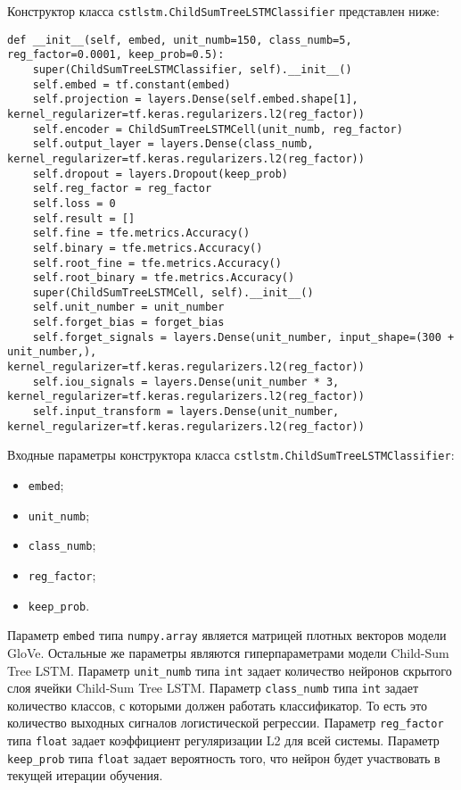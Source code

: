 Конструктор класса \texttt{cstlstm.ChildSumTreeLSTMClassifier} представлен ниже:
\medskip
\begin{lstlisting}[style=Python]
  def __init__(self, embed, unit_numb=150, class_numb=5, reg_factor=0.0001, keep_prob=0.5):
    super(ChildSumTreeLSTMClassifier, self).__init__()
    self.embed = tf.constant(embed)
    self.projection = layers.Dense(self.embed.shape[1], kernel_regularizer=tf.keras.regularizers.l2(reg_factor))
    self.encoder = ChildSumTreeLSTMCell(unit_numb, reg_factor)
    self.output_layer = layers.Dense(class_numb, kernel_regularizer=tf.keras.regularizers.l2(reg_factor))
    self.dropout = layers.Dropout(keep_prob)
    self.reg_factor = reg_factor
    self.loss = 0
    self.result = []
    self.fine = tfe.metrics.Accuracy()
    self.binary = tfe.metrics.Accuracy()
    self.root_fine = tfe.metrics.Accuracy()
    self.root_binary = tfe.metrics.Accuracy()
    super(ChildSumTreeLSTMCell, self).__init__()
    self.unit_number = unit_number
    self.forget_bias = forget_bias
    self.forget_signals = layers.Dense(unit_number, input_shape=(300 + unit_number,), kernel_regularizer=tf.keras.regularizers.l2(reg_factor))
    self.iou_signals = layers.Dense(unit_number * 3, kernel_regularizer=tf.keras.regularizers.l2(reg_factor))
    self.input_transform = layers.Dense(unit_number, kernel_regularizer=tf.keras.regularizers.l2(reg_factor))
\end{lstlisting}
\medskip

Входные параметры конструктора класса \texttt{cstlstm.ChildSumTreeLSTM\-Classifier}:
\begin{itemize}
\item \texttt{embed};
\item \texttt{unit\_numb};
\item \texttt{class\_numb};
\item \texttt{reg\_factor};
\item \texttt{keep\_prob}.
\end{itemize}

Параметр \texttt{embed} типа \texttt{numpy.array} является матрицей плотных векторов модели GloVe. Остальные же параметры являются гиперпараметрами модели Child-Sum Tree LSTM\@. Параметр \texttt{unit\_numb} типа \texttt{int} задает количество нейронов скрытого слоя ячейки Child-Sum Tree LSTM\@. Параметр \texttt{class\_numb} типа \texttt{int} задает количество классов, с которыми должен работать классификатор. То есть это количество выходных сигналов логистической регрессии. Параметр \texttt{reg\_factor} типа \texttt{float} задает коэффициент регуляризации L2 для всей системы. Параметр \texttt{keep\_prob} типа \texttt{float} задает вероятность того, что нейрон будет участвовать в текущей итерации обучения.

